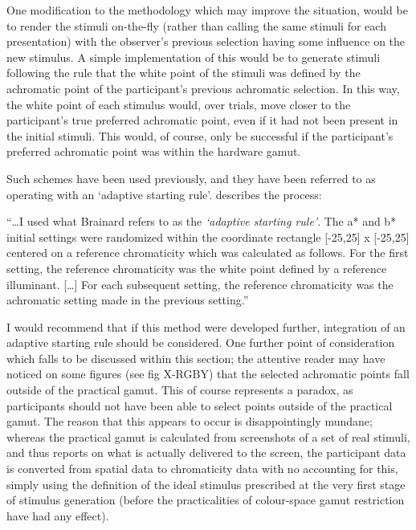 One modification to the methodology which may improve the situation, would be to render the stimuli on-the-fly (rather than calling the same stimuli for each presentation) with the observer's previous selection having some influence on the new stimulus. A simple implementation of this would be to generate stimuli following the rule that the white point of the stimuli was defined by the achromatic point of the participant's previous achromatic selection. In this way, the white point of each stimulus would, over trials, move closer to the participant's true preferred achromatic point, even if it had not been present in the initial stimuli. This would, of course, only be successful if the participant's preferred achromatic point was within the hardware gamut. 

Such schemes have been used previously, and they have been referred to as operating with an `adaptive starting rule'. \citet{delahunt_evaluation_2001} describes the process:

\begin{displayquote}
``\dots I used what Brainard refers to as the \emph{`adaptive starting rule'}. The a* and b* initial settings were randomized within the coordinate rectangle [-25,25] x [-25,25] centered on a reference chromaticity which was calculated as follows. For the first setting, the reference chromaticity was the white point defined by a reference illuminant. [\dots] For each subsequent setting, the reference chromaticity was the achromatic setting made in the previous setting.''
\end{displayquote}

I would recommend that if this method were developed further, integration of an adaptive starting rule should be considered.
One further point of consideration which falls to be discussed within this section; the attentive reader may have noticed on some figures (see fig X-RGBY) that the selected achromatic points fall outside of the practical gamut. This of course represents a paradox, as participants should not have been able to select points outside of the practical gamut. The reason that this appears to occur is disappointingly mundane; whereas the practical gamut is calculated from screenshots of a set of real stimuli, and thus reports on what is actually delivered to the screen, the participant data is converted from spatial data to chromaticity data with no accounting for this, simply using the definition of the ideal stimulus prescribed at the very first stage of stimulus generation (before the practicalities of colour-space gamut restriction have had any effect).

